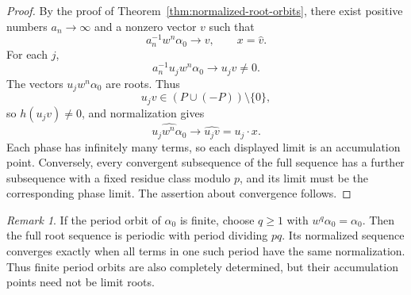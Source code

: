 \documentclass[11pt,reqno]{amsart}
\theoremstyle{plain}
\theoremstyle{definition}
\theoremstyle{remark}
\newtheorem{remark}[theorem]{Remark}
\numberwithin{equation}{section}
\begin{document}
\begin{proof}
By the proof of
Theorem~\ref{thm:normalized-root-orbits},
there exist positive numbers $a_n\to\infty$ and a nonzero
vector $v$ such that
\[
a_n^{-1}w^n\alpha_0\longrightarrow v,
\qquad
x=\widehat v.
\]
For each $j$,
\[
a_n^{-1}u_jw^n\alpha_0\longrightarrow u_jv\neq0.
\]
The vectors $u_jw^n\alpha_0$ are roots.
Thus
\[
u_jv\in(P\cup(-P))\setminus\{0\},
\]
so $h(u_jv)\neq0$, and normalization gives
\[
\widehat{u_jw^n\alpha_0}
\longrightarrow
\widehat{u_jv}
=
u_j\cdot x.
\]
Each phase has infinitely many terms, so each displayed
limit is an accumulation point.
Conversely, every convergent subsequence of the full
sequence has a further subsequence with a fixed residue
class modulo $p$, and its limit must be the corresponding
phase limit.
The assertion about convergence follows.
\end{proof}

\begin{remark}
If the period orbit of $\alpha_0$ is finite, choose $q\geq1$
with $w^q\alpha_0=\alpha_0$.
Then the full root sequence is periodic with period dividing
$pq$.
Its normalized sequence converges exactly when all terms
in one such period have the same normalization.
Thus finite period orbits are also completely determined,
but their accumulation points need not be limit roots.
\end{remark}
\end{document}
